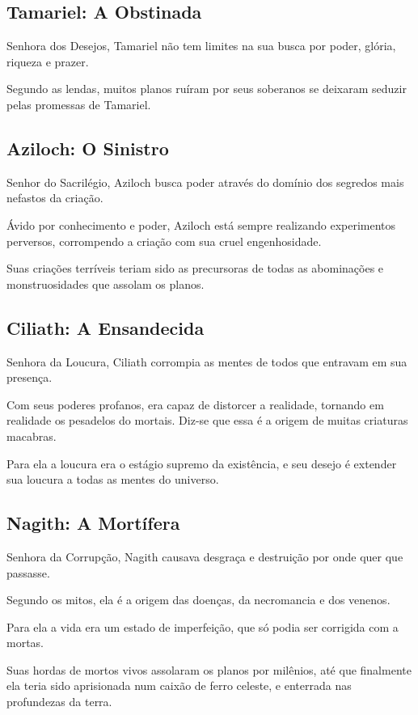 \documentclass[letterpaper,twocolumn,openany]{dndbook}
\begin{document}
	\subsection{Tamariel: A Obstinada}
	Senhora dos Desejos, Tamariel não tem limites na sua busca por poder, glória, riqueza e prazer.
	\par Segundo as lendas, muitos planos ruíram por seus soberanos se deixaram seduzir pelas promessas de Tamariel.
	
	\subsection{Aziloch: O Sinistro}
	Senhor do Sacrilégio, Aziloch busca poder através do domínio dos segredos mais nefastos da criação.
	\par Ávido por conhecimento e poder, Aziloch está sempre realizando experimentos perversos, corrompendo a criação com sua cruel engenhosidade.
	\par Suas criações terríveis teriam sido as precursoras de todas as abominações e monstruosidades que assolam os planos.
	
	\subsection{Ciliath: A Ensandecida}
	Senhora da Loucura, Ciliath corrompia as mentes de todos que entravam em sua presença.
	\par Com seus poderes profanos, era capaz de distorcer a realidade, tornando em realidade os pesadelos do mortais. Diz-se que essa é a origem de muitas criaturas macabras.
	\par Para ela a loucura era o estágio supremo da existência, e seu desejo é extender sua loucura a todas as mentes do universo.
	
	\subsection{Nagith: A Mortífera}
	Senhora da Corrupção, Nagith causava desgraça e destruição por onde quer que passasse.
	\par Segundo os mitos, ela é a origem das doenças, da necromancia e dos venenos.
	\par Para ela a vida era um estado de imperfeição, que só podia ser corrigida com a mortas.
	\par Suas hordas de mortos vivos assolaram os planos por milênios, até que finalmente ela teria sido aprisionada num caixão de ferro celeste, e enterrada nas profundezas da terra.
	
\end{document}
